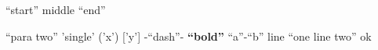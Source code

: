 \documentclass[11pt]{article}
\author{Au}
\date{2026-01-01}
\title{}
\begin{document}
\tableofcontents

``start'' middle ``end''

``para two'' 'single' ('x') ['y'] -``dash''- \textbf{``bold''} ``a''-``b''
line ``one
line two'' ok
\end{document}
